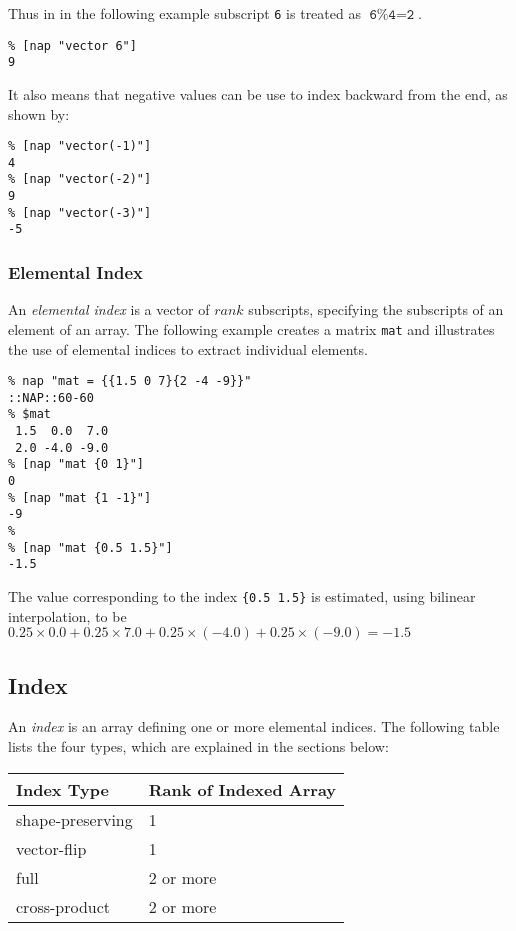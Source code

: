 Thus in in the following example subscript \texttt{6} is treated as 
$\texttt{6\%4} = \texttt{2}$.
  \begin{verbatim}
% [nap "vector 6"]
9
\end{verbatim}

It also means that negative values can be use to index backward
from the end, as shown by:
  \begin{verbatim}
% [nap "vector(-1)"]
4
% [nap "vector(-2)"]
9
% [nap "vector(-3)"]
-5
\end{verbatim}

\subsubsection{Elemental Index}
    \label{indexing-Elemental-Index}

An 
  \emph{elemental index} is a vector of 
  $rank$ subscripts, specifying the subscripts of an element
  of an array. The following example creates a matrix 
  \texttt{mat} and illustrates the use of elemental indices to
  extract individual elements.
  \begin{verbatim}
% nap "mat = {{1.5 0 7}{2 -4 -9}}"
::NAP::60-60
% $mat
 1.5  0.0  7.0
 2.0 -4.0 -9.0
% [nap "mat {0 1}"]
0
% [nap "mat {1 -1}"]
-9
% 
% [nap "mat {0.5 1.5}"]
-1.5
\end{verbatim}

The value corresponding to the index 
  \texttt{\{0.5\ 1.5\}} is estimated, using bilinear
  interpolation, to be 
$0.25 \times 0.0 + 0.25 \times 7.0 + 0.25 \times (-4.0) + 0.25 \times (-9.0) = -1.5$

\subsection{Index}
    \label{indexing-Index}

An 
  \emph{index} is an array defining one or more elemental indices.
  The following table lists the four types, which are explained in the
  sections below:
  \\ \par \begin{tabular}{|l|l|}
    \hline 
      \textbf{Index Type} & 
      \textbf{Rank of Indexed Array}
    \\
    \hline 
      shape-preserving & 
      1
    \\
    \hline 
      vector-flip & 
      1
    \\
    \hline 
      full & 
      2 or more
    \\
    \hline 
      cross-product & 
      2 or more
    \\
  \hline
\end{tabular} \\ \par

